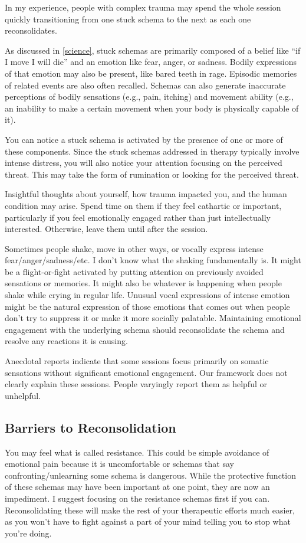\documentclass[11pt,oneside]{book}
\begin{document}
In my experience, people with complex trauma may spend the whole session quickly transitioning from one stuck schema to the next as each one reconsolidates.

As discussed in \cref{science}, stuck schemas are primarily composed of a belief like \enquote{if I move I will die} and an emotion like fear, anger, or sadness. Bodily expressions of that emotion may also be present, like bared teeth in rage. Episodic memories of related events are also often recalled. Schemas can also generate inaccurate perceptions of bodily sensations (e.g., pain, itching) and movement ability (e.g., an inability to make a certain movement when your body is physically capable of it).

You can notice a stuck schema is activated by the presence of one or more of these components. Since the stuck schemas addressed in therapy typically involve intense distress, you will also notice your attention focusing on the perceived threat. This may take the form of rumination or looking for the perceived threat.

Insightful thoughts about yourself, how trauma impacted you, and the human condition may arise. Spend time on them if they feel cathartic or important, particularly if you feel emotionally engaged rather than just intellectually interested. Otherwise, leave them until after the session.

Sometimes people shake, move in other ways, or vocally express intense fear/anger/sadness/etc. I don't know what the shaking fundamentally is. It might be a flight-or-fight activated by putting attention on previously avoided sensations or memories. It might also be whatever is happening when people shake while crying in regular life. Unusual vocal expressions of intense emotion might be the natural expression of those emotions that comes out when people don't try to suppress it or make it more socially palatable. Maintaining emotional engagement with the underlying schema should reconsolidate the schema and resolve any reactions it is causing.

Anecdotal reports indicate that some sessions focus primarily on somatic sensations without significant emotional engagement. Our framework does not clearly explain these sessions. People varyingly report them as helpful or unhelpful.

\subsection*{Barriers to Reconsolidation}
You may feel what is called resistance. This could be simple avoidance of emotional pain because it is uncomfortable or schemas that say confronting/unlearning some schema is dangerous. While the protective function of these schemas may have been important at one point, they are now an impediment. I suggest focusing on the resistance schemas first if you can. Reconsolidating these will make the rest of your therapeutic efforts much easier, as you won't have to fight against a part of your mind telling you to stop what you're doing.
\end{document}
